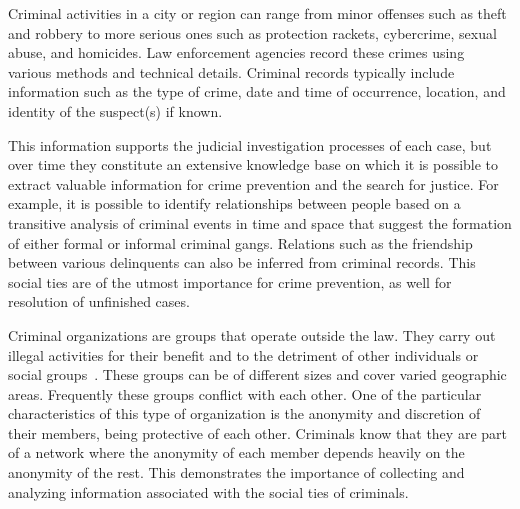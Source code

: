 
Criminal activities in a city or region can range from minor offenses such as theft and robbery to more serious ones such as protection rackets, cybercrime, sexual abuse, and homicides. Law enforcement agencies record these crimes using various methods and technical details. Criminal records typically include information such as the type of crime, date and time of occurrence, location, and identity of the suspect(s) if known.


This information supports the judicial investigation processes of each case, but over time they constitute an extensive knowledge base on which it is possible to extract valuable information for crime prevention and the search for justice. For example, it is possible to identify relationships between people based on a transitive analysis of criminal events in time and space that suggest the formation of either formal or informal criminal gangs. Relations such as the friendship between various delinquents can also be inferred from criminal records. This social ties are of the utmost importance for crime prevention, as well for resolution of unfinished cases.


Criminal organizations are groups that operate outside the law. They carry out illegal activities for their benefit and to the detriment of other individuals or social groups~\cite{finckenauer2005problems}. These groups can be of different sizes and cover varied geographic areas. Frequently these groups conflict with each other. One of the particular characteristics of this type of organization is the anonymity and discretion of their members, being protective of each other. Criminals know that they are part of a network where the anonymity of each member depends heavily on the anonymity of the rest. This demonstrates the importance of collecting and analyzing information associated with the social ties of criminals.

